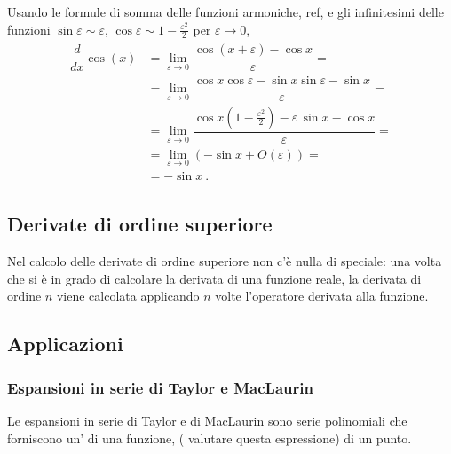 \documentclass[letterpaper,10pt,english]{jupyterBook}
\begin{document}
\sphinxAtStartPar
Usando le formule di somma delle funzioni armoniche,  ref, e gli infinitesimi delle funzioni \(\sin \varepsilon \sim \varepsilon\), \(\cos \varepsilon \sim 1 - \frac{\varepsilon^2}{2}\) per \(\varepsilon \rightarrow 0\),
\begin{equation*}
\begin{split}\begin{aligned}
  \dfrac{d}{dx} \cos(x) 
  & = \lim_{\varepsilon \rightarrow 0}  \dfrac{\cos(x+\varepsilon) - \cos x}{\varepsilon} = \\
  & = \lim_{\varepsilon \rightarrow 0} \dfrac{\cos x \cos \varepsilon - \sin x \sin \varepsilon - \sin x}{\varepsilon} = \\
  & = \lim_{\varepsilon \rightarrow 0} \dfrac{\cos x \left( 1 - \frac{\varepsilon^2}{2} \right) - \varepsilon \, \sin x - \cos x}{\varepsilon} = \\
  & = \lim_{\varepsilon \rightarrow 0} \left( - \sin x + O(\varepsilon) \right) = \\
  & = - \sin x \ .
\end{aligned}\end{split}
\end{equation*}

\subsection{Derivate di ordine superiore}
\label{\detokenize{ch/infinitesimal_calculus/derivatives:derivate-di-ordine-superiore}}\label{\detokenize{ch/infinitesimal_calculus/derivatives:infinitesimal-calculus-derivatives-higher}}
\sphinxAtStartPar
Nel calcolo delle derivate di ordine superiore non c’è nulla di speciale: una volta che si è in grado di calcolare la derivata di una funzione reale, la derivata di ordine \(n\) viene calcolata applicando \(n\) volte l’operatore derivata alla funzione.


\subsection{Applicazioni}
\label{\detokenize{ch/infinitesimal_calculus/derivatives:applicazioni}}\label{\detokenize{ch/infinitesimal_calculus/derivatives:infinitesimal-calculus-derivatives-applications}}

\subsubsection{Espansioni in serie di Taylor e MacLaurin}
\label{\detokenize{ch/infinitesimal_calculus/derivatives:espansioni-in-serie-di-taylor-e-maclaurin}}\label{\detokenize{ch/infinitesimal_calculus/derivatives:infinitesimal-calculus-derivatives-taylor}}
\sphinxAtStartPar
Le espansioni in serie di Taylor e di MacLaurin sono serie polinomiali che forniscono un’ di una funzione,  ( valutare questa espressione) di un punto.
\end{document}
